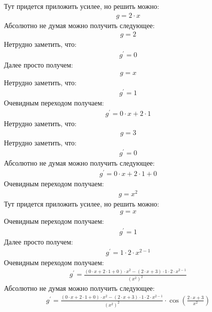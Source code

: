 \documentclass[12pt,a4paper]{scrartcl}
\begin{document}
Тут придется приложить усилее, но решить можно:
\begin{gather}\label{eq:1}g  = 2 \cdot x\end{gather}
Абсолютно не думая можно получить следующее:
\begin{gather}\label{eq:1}g  = 2\end{gather}
Нетрудно заметить, что:
\begin{gather}\label{eq:1}g^\prime  = 0\end{gather}
Далее просто получем:
\begin{gather}\label{eq:1}g  = x\end{gather}
Нетрудно заметить, что:
\begin{gather}\label{eq:1}g^\prime  = 1\end{gather}
Очевидным переходом получаем:
\begin{gather}\label{eq:1}g^\prime  = 0 \cdot x + 2 \cdot 1\end{gather}
Нетрудно заметить, что:
\begin{gather}\label{eq:1}g  = 3\end{gather}
Нетрудно заметить, что:
\begin{gather}\label{eq:1}g^\prime  = 0\end{gather}
Абсолютно не думая можно получить следующее:
\begin{gather}\label{eq:1}g^\prime  = 0 \cdot x + 2 \cdot 1 + 0\end{gather}
Очевидным переходом получаем:
\begin{gather}\label{eq:1}g  = x ^ {2}\end{gather}
Тут придется приложить усилее, но решить можно:
\begin{gather}\label{eq:1}g  = x\end{gather}
Очевидным переходом получаем:
\begin{gather}\label{eq:1}g^\prime  = 1\end{gather}
Далее просто получем:
\begin{gather}\label{eq:1}g^\prime  = 1 \cdot 2 \cdot x ^ {2 - 1}\end{gather}
Очевидным переходом получаем:
\begin{gather}\label{eq:1}g^\prime  = \frac{\left(0 \cdot x + 2 \cdot 1 + 0\right) \cdot x ^ {2} - \left(2 \cdot x + 3\right) \cdot 1 \cdot 2 \cdot x ^ {2 - 1}}{{ \left(x ^ {2}\right) } ^ {2}}\end{gather}
Абсолютно не думая можно получить следующее:
\begin{gather}\label{eq:1}g^\prime  = \frac{\left(0 \cdot x + 2 \cdot 1 + 0\right) \cdot x ^ {2} - \left(2 \cdot x + 3\right) \cdot 1 \cdot 2 \cdot x ^ {2 - 1}}{{ \left(x ^ {2}\right) } ^ {2}} \cdot  \cos{ \left(\frac{2 \cdot x + 3}{x ^ {2}}\right) } \end{gather}
\end{document}
